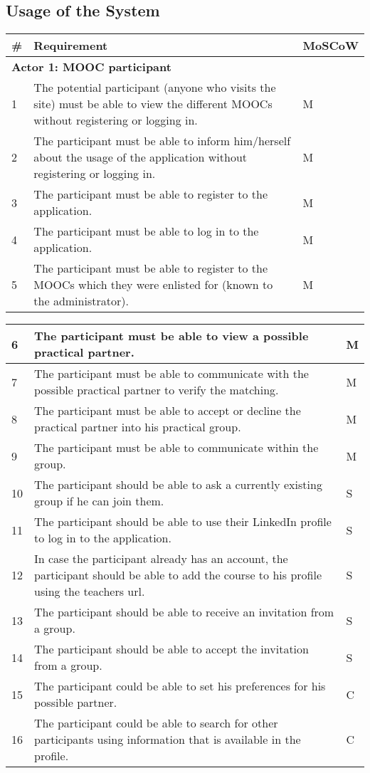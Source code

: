 \subsection{Usage of the System}
\begin{tabular}{ | p{0.5cm} | p{12cm} | p{2cm} | }
\hline
\textbf{\#} & \textbf{Requirement} & \textbf{MoSCoW} \\ \hline
\multicolumn{3}{|p{14.5cm}|}{\textbf{Actor 1: MOOC participant}} \\ \hline
1 & The potential participant (anyone who visits the site) must be able to view the different MOOCs without registering or logging in. & M \\ \hline
2 & The participant must be able to inform him/herself about the usage of the application without registering or logging in. & M \\ \hline
3 & The participant must be able to register to the application. & M \\ \hline
4 & The participant must be able to log in to the application. & M \\ \hline
5 & The participant must be able to register to the MOOCs which they were enlisted for (known to the administrator). & M \\ \hline
\end{tabular}
\begin{tabular}{ | p{0.5cm} | p{12cm} | p{2cm} | }
\hline
6 & The participant must be able to view a possible practical partner. & M \\ \hline
7 & The participant must be able to communicate with the possible practical partner to verify the matching. & M \\ \hline
8 & The participant must be able to accept or decline the practical partner into his practical group. & M \\ \hline
9 & The participant must be able to communicate within the group. & M \\ \hline
10 & The participant should be able to ask a currently existing group if he can join them. & S \\ \hline
11 & The participant should be able to use their LinkedIn profile to log in to the application. & S \\ \hline
12 & In case the participant already has an account, the participant should be able to add the course to his profile using the teachers url. & S \\ \hline
13 & The participant should be able to receive an invitation from a group. & S \\ \hline
14 & The participant should be able to accept the invitation from a group. & S \\ \hline
15 & The participant could be able to set his preferences for his possible partner. & C \\ \hline
16 & The participant could be able to search for other participants using information that is available in the profile. & C \\ \hline
\end{tabular}

